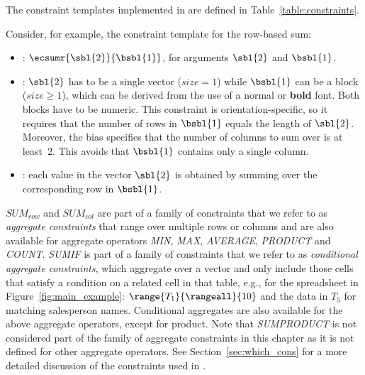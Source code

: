 The constraint templates implemented in \sname are defined in Table~\ref{table:constraints}.

\begin{example}
Consider, for example, the constraint template for the row-based sum:
\begin{itemize}
  \item \CName: $\ecsumr{\sbl{2}}{\bsbl{1}}$, for arguments $\sbl{2}$ and $\bsbl{1}$.
  
  \item \CSignature: $\sbl{2}$ has to be a single vector ($\textit{size}=1$) while $\bsbl{1}$ can be a block ($\textit{size} \geq 1$), which can be derived from the use of a normal or \textbf{bold} font.
  Both blocks have to be numeric.
  This constraint is orientation-specific, so it requires that the number of rows in $\bsbl{1}$ equals the length of $\sbl{2}$.
  Moreover, the bias specifies that the number of columns to sum over is at least~$2$. This avoids that $\bsbl{1}$ contains only a single column.
  
  \item \CFunction: each value in the vector $\sbl{2}$ is obtained by summing over the corresponding row in $\bsbl{1}$.
\end{itemize}

$\textit{SUM}_\textit{row}$ and $\textit{SUM}_\textit{col}$ are part of a family of constraints that we refer to as \emph{aggregate constraints} that range over multiple rows or columns and are also available for aggregate operators \textit{MIN}, \textit{MAX}, \textit{AVERAGE}, \textit{PRODUCT} and \textit{COUNT}.
\textit{SUMIF} is part of a family of constraints that we refer to as \emph{conditional aggregate constraints}, which aggregate over a vector and only include those cells that satisfy a condition on a related cell in that table, e.g., for the spreadsheet in Figure~\ref{fig:main_example}: $\range{T_1}{\rangeall}{10}$ and the data in $T_5$ for matching salesperson names.
Conditional aggregates are also available for the above aggregate operators, except for product. Note that \textit{SUMPRODUCT} is not considered part of the family of aggregate constraints in this chapter as it is not defined for other aggregate operators. See Section~\ref{sec:which_cons} for a more detailed discussion of the constraints used in \sname.
\end{example}


